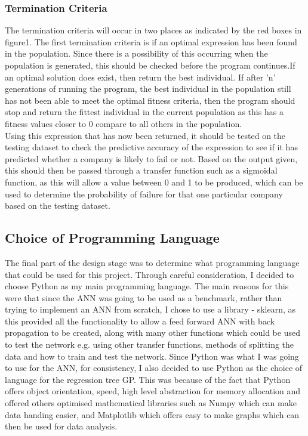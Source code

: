 \documentclass[11pt]{article}
\begin{document}
\subsubsection{Termination Criteria}
The termination criteria will occur in two places as indicated by the red boxes in figure1. The first termination criteria is if an optimal expression has been found in the population. Since there is a possibility of this occurring when the population is generated, this should be checked before the program continues.If an optimal solution does exist, then return the best individual. If after 'n' generations of running the program, the best individual in the population still has not been able to meet the optimal fitness criteria, then the program should stop  and return the fittest individual in the current population as this has a fitness values closer to 0 compare to all others in the population.  \\
Using this expression that has now been returned, it should be tested on the testing dataset to check the predictive accuracy of the expression to see if it has predicted whether a company is likely to fail or not. Based on the output given, this should then be passed through a transfer function such as a sigmoidal function, as this will allow a value between 0 and 1 to be produced, which can be used to determine the probability of failure for that one particular company based on the testing dataset. 

\subsection{Choice of Programming Language}
The final part of the design stage was to determine what programming language that could be used for this project. Through careful consideration, I decided to choose Python as my main programming language. The main reasons for this were that since the ANN was going to be used as a benchmark, rather than trying to implement an ANN from scratch, I chose to use a library - sklearn, as this provided all the functionality to allow a feed forward ANN with back propagation to be created, along with many other functions which could be used to test the network e.g. using other transfer functions, methods of splitting the data and how to train and test the network. Since Python was what I was going to use for the ANN, for consistency, I also decided to use Python as the choice of language for the regression tree GP. This was because of the fact that Python offers object orientation, speed, high level abstraction for memory allocation and offered others optimised mathematical libraries such as Numpy which can make data handing easier, and Matplotlib which offers easy to make graphs which can then be used for data analysis.
\end{document}
